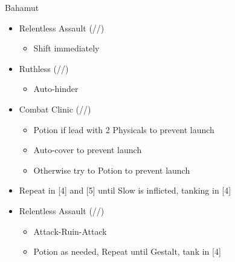 
	\renewcommand{\first}{[1] Relentless Assault (\com/\rav/\rav)}
	\renewcommand{\fifth}{[5] Ruthless (\sab/\com/\rav)
		\renewcommand{\fourth}{[4] Combat Clinic (\sen/\med/\med)}}
	\begin{battle}[0:50]{Bahamut}
		\begin{itemize}
			\item \first
			      \begin{itemize}
				      \item Shift immediately
			      \end{itemize}
			\item \fifth
			      \begin{itemize}
				      \item Auto-hinder
			      \end{itemize}
			\item \fourth
			      \begin{itemize}
				      \item Potion if lead with 2 Physicals to prevent launch
                                                 \item Auto-cover to prevent launch
				      \item Otherwise try to Potion to prevent launch
			      \end{itemize}
			\item Repeat in [4] and [5] until Slow is inflicted, tanking in [4]
			\item \first
			      \begin{itemize}
				      \item Attack-Ruin-Attack
				      \item Potion as needed, Repeat until Gestalt, tank in [4]
			      \end{itemize}
		\end{itemize}
	\end{battle}
	\vfill
	\ 
	\columnbreak
